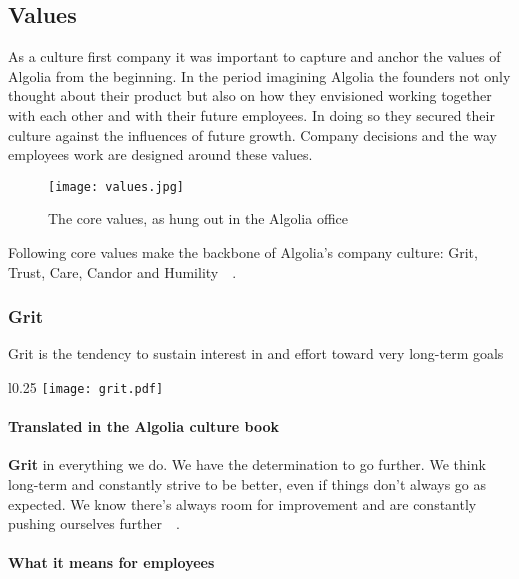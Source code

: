 \subsection{Values}
\label{sub:values}

As a culture first company it was important to capture and anchor the values of Algolia from the beginning. In the period imagining Algolia the founders not only thought about their product but also on how they envisioned working together with each other and with their future employees. In doing so they secured their culture against the influences of future growth. Company decisions and the way employees work are designed around these values.

\begin{figure}[H]
  \centering
  \texttt{[image: values.jpg]}
  \caption{The core values, as hung out in the Algolia office\cite{culture-first}}
  \label{figure:values}
\end{figure}

Following core values make the backbone of Algolia's company culture: Grit, Trust, Care, Candor and Humility~\cite{algolia-values}~. 

\subsubsection{Grit}
\label{ssub:grit}

\begin{definition}
Grit is the tendency to sustain interest in and effort toward very long-term goals\cite{Duckworth201605}
\end{definition}

\begin{wrapfigure}{l}{0.25\textwidth}
  \centering
  \texttt{[image: grit.pdf]}
\end{wrapfigure}

\paragraph{Translated in the Algolia culture book}

\textbf{Grit} in everything we do. We have the determination to go further. We think long-term and constantly strive to be better, even if things don’t always go as expected. We know there's always room for improvement and are constantly pushing ourselves further~\cite{algolia-careers}~.

\paragraph{What it means for employees} 

